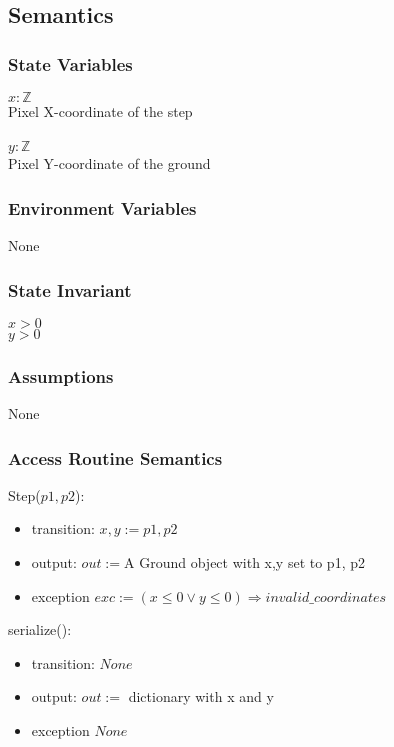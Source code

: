 \documentclass[12pt]{article}
\begin{document}
\subsection* {Semantics}

\subsubsection* {State Variables}

$x: \mathbb{Z}$\\
Pixel X-coordinate of the step\\\\
$y: \mathbb{Z}$\\
Pixel Y-coordinate of the ground\\
\subsubsection* {Environment Variables}
None
\subsubsection* {State Invariant}
$x > 0$\\
$y > 0$\\ 
\subsubsection* {Assumptions}
None
\subsubsection* {Access Routine Semantics}

\noindent Step($p1, p2$):
\begin{itemize}
\item transition: $x,y := p1, p2$
\item output: $out := $A Ground object with x,y set to p1, p2
\item exception $ exc := (x \leq 0 \lor y \leq 0 ) \Rightarrow invalid\_coordinates $
\end{itemize}

\color{red}
\noindent serialize():
\begin{itemize}
\item transition: $None$
\item output: $out := $ dictionary with x and y
\item exception $ None $
\end{itemize}
\color{black}
\end{document}
